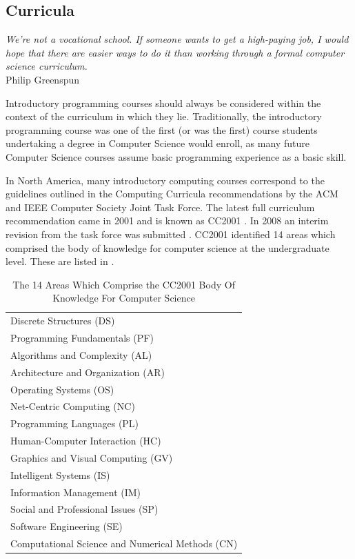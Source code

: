 \subsection{Curricula}

\begin{flushright}
\textit{We're not a vocational school. If someone wants to get a high-paying job, I would hope that there are easier ways to do it than working through a formal computer science curriculum.}
\\
Philip Greenspun \cite{Greenspun00} \\
\end{flushright}

Introductory programming courses should always be considered within the context of the curriculum in which they lie.  Traditionally, the introductory programming course was one of the first (or was the first) course students undertaking a degree in Computer Science would enroll, as many future Computer Science courses assume basic programming experience as a basic skill.

In North America, many introductory computing courses correspond to the guidelines outlined in the Computing Curricula recommendations by the ACM and IEEE Computer Society Joint Task Force.  The latest full curriculum recommendation came in 2001 and is known as CC2001 \cite{cc2001}.  In 2008 an interim revision from the task force was submitted \cite{cs2008}.  CC2001 identified 14 areas which comprised the body of knowledge for computer science at the undergraduate level.  These are listed in .

\begin{table}
	\caption{The 14 Areas Which Comprise the CC2001 Body Of Knowledge For Computer Science}
\begin{tabular}{l}
Discrete Structures (DS) \\
Programming Fundamentals (PF) \\
Algorithms and Complexity (AL) \\
Architecture and Organization (AR) \\
Operating Systems (OS) \\
Net-Centric Computing (NC) \\
Programming Languages (PL) \\
Human-Computer Interaction (HC) \\
Graphics and Visual Computing (GV) \\
Intelligent Systems (IS) \\
Information Management (IM) \\
Social and Professional Issues (SP) \\
Software Engineering (SE) \\
Computational Science and Numerical Methods (CN) \\
\end{tabular}
	\label{tab:CC2001BOK}
\end{table}

